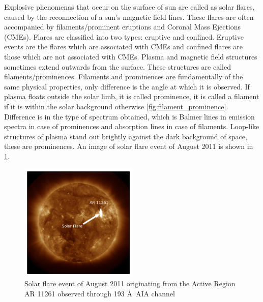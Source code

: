 Explosive phenomenas that occur on the surface of sun are called as solar flares, caused by the reconnection of a sun's magnetic field lines. These flares are often accompanied by filaments/prominent eruptions and Coronal Mass Ejections (CMEs). Flares are classified into two types: eruptive and confined. Eruptive events are the flares which are associated with CMEs and confined flares are those which are not associated with CMEs. Plasma and magnetic field structures sometimes extend outwards from the surface. These structures are called filaments/prominences. Filaments and prominences are fundamentally of the same physical properties, only difference is the angle at which it is observed. If plasma floats outside the solar limb, it is called prominence, it is called a filament if it is within the solar background otherwise \cref{fig:filament_prominence}. Difference is in the type of spectrum obtained, which is Balmer lines in emission spectra in case of prominences and absorption lines in case of filaments. Loop-like structures of plasma stand out brightly against the dark background of space, these are prominences. An image of solar flare event of  August 2011 is shown in \cref{fig:solar_flare_4_aug_2011}.

\begin{figure}
    \centering
    \includegraphics[width=0.5\textwidth]{images/solar_flare_4_aug_2011.png}
    \caption[Solar flare ( August 2011)]{Solar flare event of  August 2011 originating from the Active Region AR 11261 observed through 193 \AA \ AIA channel}
    \label{fig:solar_flare_4_aug_2011}
\end{figure}

